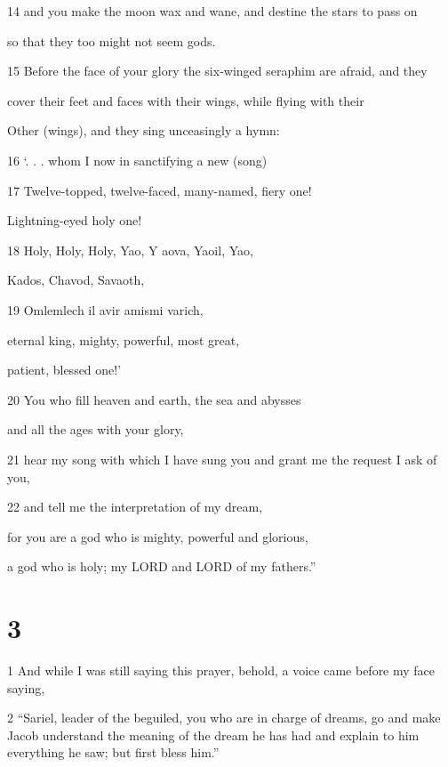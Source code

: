 \par 14 and you make the moon wax and wane, and destine the stars to pass on
\par so that they too might not seem gods.

\par 15 Before the face of your glory the six-winged seraphim are afraid, and they
\par cover their feet and faces with their wings, while flying with their
\par Other (wings), and they sing unceasingly a hymn:

\par 16 ‘. . . whom I now in sanctifying a new (song)

\par 17 Twelve-topped, twelve-faced, many-named, fiery one!
\par Lightning-eyed holy one!

\par 18 Holy, Holy, Holy, Yao, Y aova, Yaoil, Yao,
\par Kados, Chavod, Savaoth,

\par 19 Omlemlech il avir amismi varich,
\par eternal king, mighty, powerful, most great,
\par patient, blessed one!’

\par 20 You who fill heaven and earth, the sea and abysses
\par and all the ages with your glory,

\par 21 hear my song with which I have sung you and grant me the request I ask of you,

\par 22 and tell me the interpretation of my dream,
\par for you are a god who is mighty, powerful and glorious,
\par a god who is holy; my LORD and LORD of my fathers.”

\chapter{3}


\par 1 And while I was still saying this prayer, behold, a voice came before my face saying, 

\par 2 “Sariel, leader of the beguiled, you who are in charge of dreams, go and make Jacob understand the meaning of the dream he has had and explain to him everything he saw; but first bless him.”

